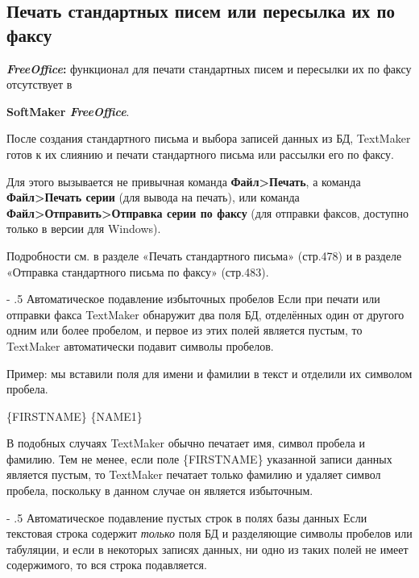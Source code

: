 ﻿\documentclass[a4paper,10pt]{article}
\makeatletter
\renewcommand\paragraph{%
   \@startsection{paragraph}{4}{0mm}%
      {-\baselineskip}%
      {.5\baselineskip}%
      {\normalfont\normalsize\bfseries}}
\makeatother
\begin{document}
\subsection{Печать стандартных писем или пересылка их по факсу}
\begin{mdframed}[backgroundcolor=pink!50]
\textbf{\textit{FreeOffice}:} функционал для печати стандартных писем и пересылки их по факсу отсутствует в 

\textbf{SoftMaker \textit{FreeOffice}}.
\end{mdframed}

После создания стандартного письма и выбора записей данных из БД, TextMaker готов к их слиянию и печати стандартного письма или рассылки его по факсу.

Для этого вызывается не привычная команда \textbf{Файл>Печать}, а команда \textbf{Файл>Печать серии} (для вывода на печать), или команда \textbf{Файл>Отправить>Отправка серии по факсу} (для отправки факсов, доступно только в версии для Windows).

Подробности см. в разделе «Печать стандартного письма» (стр.478) и в разделе «Отправка стандартного письма по факсу» (стр.483).

\paragraph{Автоматическое подавление избыточных пробелов}
Если при печати или отправки факса TextMaker обнаружит два поля БД, отделённых один от другого одним или более пробелом, и первое из этих полей является пустым, то TextMaker автоматически подавит символы пробелов.

Пример: мы вставили поля для имени и фамилии в текст и отделили их символом пробела.

\{FIRSTNAME\} \{NAME1\}

В подобных случаях TextMaker обычно печатает имя, символ пробела и фамилию. Тем не менее, если поле \{FIRSTNAME\} указанной записи данных является пустым, то TextMaker печатает только фамилию и удаляет символ пробела, поскольку в данном случае он является избыточным.

\paragraph{Автоматическое подавление пустых строк в полях базы данных}
Если текстовая строка содержит \textit{только} поля БД и разделяющие символы пробелов или табуляции, и если в некоторых записях данных, ни одно из таких полей не имеет содержимого, то вся строка подавляется.
\end{document}
